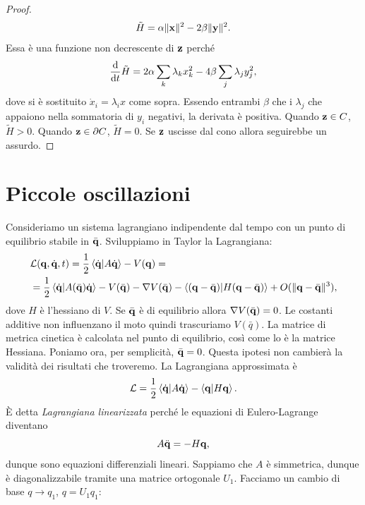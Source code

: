 \begin{proof}
    \begin{equation}
        \tilde{H} = \alpha\|\mathbf{x}\|^2-2\beta\|\mathbf{y}\|^2.
    \end{equation}
    Essa è una funzione non decrescente di $\mathbf{z}$ perché
    \begin{equation}
        \frac{\mathrm{d}}{\mathrm{d}t} \tilde{H} = 2\alpha\sum_k\lambda_k x^2_k-4\beta\sum_j \lambda_j y_j^2,
    \end{equation}
    dove si è sostituito $\dot{x}_i=\lambda_ix$ come sopra. 
    Essendo entrambi $\beta$ che i $\lambda_j$ che appaiono nella sommatoria di $y_i$ negativi, la derivata è positiva.
     Quando $\mathbf{z} \in C$, $\tilde{H}>0$. Quando $\mathbf{z} \in \partial C$, $\tilde{H}=0$. 
     Se $\mathbf{z}$ uscisse dal cono allora seguirebbe un assurdo.
\end{proof}
    \section{Piccole oscillazioni}
    Consideriamo un sistema lagrangiano indipendente dal tempo con un punto di equilibrio stabile in $\bar{\mathbf{q}}$. Sviluppiamo in Taylor la Lagrangiana:
    \begin{equation}
    \begin{aligned}
        &\mathcal{L}(\mathbf{q},\dot{\mathbf{q}},t) = \frac{1}{2}\braket{\dot{\mathbf{q}}|A\dot{\mathbf{q}}}-V(\mathbf{q}) = \\
        &=\frac{1}{2}\braket{\dot{\mathbf{q}}|A(\bar{\mathbf{q}})\dot{\mathbf{q}}}-V(\bar{\mathbf{q}})-\nabla V(\bar{\mathbf{q}})-\braket{(\mathbf{q}-\bar{\mathbf{q}})|H(\mathbf{q}-\bar{\mathbf{q}})} +O(\|\mathbf{q}-\bar{\mathbf{q}}\|^3),
    \end{aligned}
    \end{equation}
    dove $H$ è l'hessiano di $V$. Se $\bar{\mathbf{q}}$ è di equilibrio allora $\nabla V(\bar{\mathbf{q}})=0$. Le costanti additive non influenzano il moto quindi trascuriamo $V(\bar{q})$. La matrice di metrica cinetica è calcolata nel punto di equilibrio, così come lo è la matrice Hessiana. Poniamo ora, per semplicità, $\bar{\mathbf{q}}=0$. Questa ipotesi non cambierà la validità dei risultati che troveremo. La Lagrangiana approssimata è 
    \begin{equation}
        \mathcal{L} = \frac{1}{2}\braket{\dot{\mathbf{q}}|A\dot{\mathbf{q}}}-\braket{\mathbf{q}|H\mathbf{q}}.
    \end{equation}
    È detta \emph{Lagrangiana linearizzata} perché le equazioni di Eulero-Lagrange diventano
    \begin{equation}
        A\ddot{\mathbf{q}} = -H\mathbf{q},
    \end{equation}
    dunque sono equazioni differenziali lineari. 
    Sappiamo che $A$ è simmetrica, dunque è diagonalizzabile tramite una matrice ortogonale $U_1$. Facciamo un cambio di base $q\to q_1$, $q = U_1q_1$:
